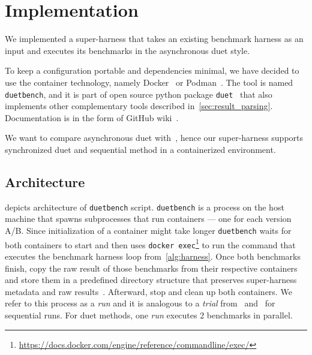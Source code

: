 \chapter{Implementation}
\label{chap:impl}

We implemented a super-harness that takes an existing benchmark harness as an input and executes its benchmarks in the asynchronous duet style.

To keep a configuration portable and dependencies minimal, we have decided to use the container technology, namely Docker~\cite{merkel2014docker} or Podman~\cite{podman}.
The tool is named \lstinline{duetbench}, and it is part of open source python package \lstinline{duet}~\cite{duet} that also implements other complementary tools described in~\cref{sec:result_parsing}.
Documentation is in the form of GitHub wiki~\cite{wiki}.

We want to compare asynchronous duet with~\citet{bulej2020duet}, hence our super-harness supports synchronized duet and sequential method in a containerized environment.

\section{Architecture}

 depicts architecture of \lstinline{duetbench} script.
\lstinline{duetbench} is a process on the host machine that spawns subprocesses that run containers --- one for each version A/B.
Since initialization of a container might take longer \lstinline{duetbench} waits for both containers to start and then uses \lstinline{docker exec}\footnote{\url{https://docs.docker.com/engine/reference/commandline/exec/}} to run the command that executes the benchmark harness loop from~\cref{alg:harness}.
Once both benchmarks finish, copy the raw result of those benchmarks from their respective containers and store them in a predefined directory structure that preserves super-harness metadata and raw results~\cite{wiki}.
Afterward, stop and clean up both containers.
We refer to this process as a \emph{run} and it is analogous to a \emph{trial} from~\citet{laaber2019software} and~\citet{abedi2017conducting} for sequential runs.
For duet methods, one \emph{run} executes 2 benchmarks in parallel.

